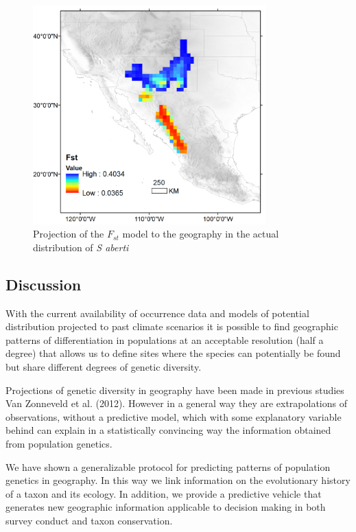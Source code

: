 \documentclass[
]{article}
\begin{document}
\begin{figure}
\centering
\includegraphics[width=0.8\textwidth,height=\textheight]{all_figures/figure_6.png}
\caption{Projection of the \(F_{st}\) model to the geography in the
actual distribution of \emph{S aberti}}
\end{figure}

\hypertarget{discussion}{%
\subsection{Discussion}\label{discussion}}

With the current availability of occurrence data and models of potential
distribution projected to past climate scenarios it is possible to find
geographic patterns of differentiation in populations at an acceptable
resolution (half a degree) that allows us to define sites where the
species can potentially be found but share different degrees of genetic
diversity.

Projections of genetic diversity in geography have been made in previous
studies Van Zonneveld et al. (2012). However in a general way they are
extrapolations of observations, without a predictive model, which with
some explanatory variable behind can explain in a statistically
convincing way the information obtained from population genetics.

We have shown a generalizable protocol for predicting patterns of
population genetics in geography. In this way we link information on the
evolutionary history of a taxon and its ecology. In addition, we provide
a predictive vehicle that generates new geographic information
applicable to decision making in both survey conduct and taxon
conservation.
\end{document}
